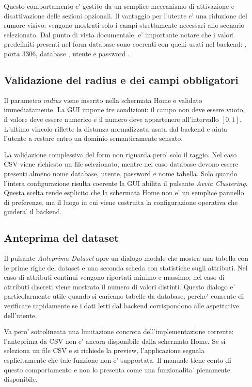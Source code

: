 Questo comportamento e' gestito da un semplice meccanismo di attivazione e disattivazione
delle sezioni opzionali. Il vantaggio per l'utente e' una riduzione del rumore visivo:
vengono mostrati solo i campi strettamente necessari allo scenario selezionato. Dal punto
di vista documentale, e' importante notare che i valori predefiniti presenti nel form
database sono coerenti con quelli usati nel backend: , porta 3306,
database , utente  e password .

\subsection{Validazione del radius e dei campi obbligatori}

Il parametro \emph{radius} viene inserito nella schermata Home e validato immediatamente.
La GUI impone tre condizioni: il campo non deve essere vuoto, il valore deve essere
numerico e il numero deve appartenere all'intervallo $[0,1]$. L'ultimo vincolo riflette
la distanza normalizzata usata dal backend e aiuta l'utente a restare entro un dominio
semanticamente sensato.

La validazione complessiva del form non riguarda pero' solo il raggio. Nel caso CSV viene
richiesto un file selezionato, mentre nel caso database devono essere presenti almeno
nome database, utente, password e nome tabella. Solo quando l'intera configurazione
risulta coerente la GUI abilita il pulsante \emph{Avvia Clustering}. Questa scelta rende
esplicito che la schermata Home non e' un semplice pannello di preferenze, ma il luogo in
cui viene costruita la configurazione operativa che guidera' il backend.

\subsection{Anteprima del dataset}

Il pulsante \emph{Anteprima Dataset} apre un dialogo modale che mostra una tabella con le
prime righe del dataset e una seconda scheda con statistiche sugli attributi. Nel caso di
attributi continui vengono riportati minimo e massimo; nel caso di attributi discreti
viene mostrato il numero di valori distinti. Questo dialogo e' particolarmente utile
quando si caricano tabelle da database, perche' consente di verificare rapidamente se i
dati letti dal backend corrispondono alle aspettative dell'utente.

Va pero' sottolineata una limitazione concreta dell'implementazione corrente: l'anteprima
da CSV non e' ancora disponibile dalla schermata Home. Se si seleziona un file CSV e si
richiede la preview, l'applicazione segnala esplicitamente che tale funzione non e'
supportata. Il manuale tiene conto di questo comportamento e non lo presenta come una
funzionalita' pienamente disponibile.

